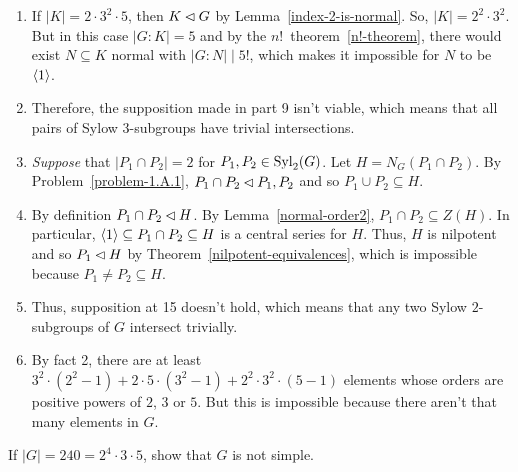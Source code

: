 \begin{solution}
\begin{enumerate}[\upshape1.]
    \item If $|K|=2\cdot3^2\cdot5$, then $K\lhd G$ by Lemma~\ref{index-2-is-normal}. So, $|K|=2^2\cdot3^2$. But in this case $|G:K|=5$ and by the $n!$~theorem~\ref{n!-theorem}, there would exist $N\subseteq K$ normal with $|G:N|\mid 5!$, which makes it impossible for $N$ to be $\langle1\rangle$.
    \item Therefore, the supposition made in part 9 isn't viable, which means that all pairs of Sylow $3$-subgroups have trivial intersections.
    \item {\it Suppose\/} that $|P_1\cap P_2|=2$ for $P_1,P_2\in{\rm Syl}_2(G)$. Let $H=N_G(P_1\cap P_2)$. By Problem~\ref{problem-1.A.1}, $P_1\cap P_2\lhd P_1,P_2$ and so $P_1\cup P_2\subseteq H$.
    \item By definition $P_1\cap P_2\lhd H$. By Lemma~\ref{normal-order2}, $P_1\cap P_2\subseteq Z(H)$. In particular, $\langle1\rangle\subseteq P_1\cap P_2\subseteq H$ is a central series for $H$. Thus, $H$ is nilpotent and so $P_1\lhd H$ by Theorem~\ref{nilpotent-equivalences}, which is impossible because $P_1\ne P_2\subseteq H$.
    \item Thus, supposition at 15 doesn't hold, which means that any two Sylow $2$-subgroups of $G$ intersect trivially.
    \item By fact 2, there are at least $3^2\cdot(2^2-1)+2\cdot5\cdot(3^2-1)+2^2\cdot3^2\cdot(5-1)$ elements whose orders are positive powers of $2$, $3$ or $5$. But this is impossible because there aren't that many elements in $G$.
\end{enumerate}
\end{solution}

\begin{probl}
    If\/ $|G|=240=2^4\cdot 3\cdot 5$, show that $G$ is not simple.
\end{probl}


